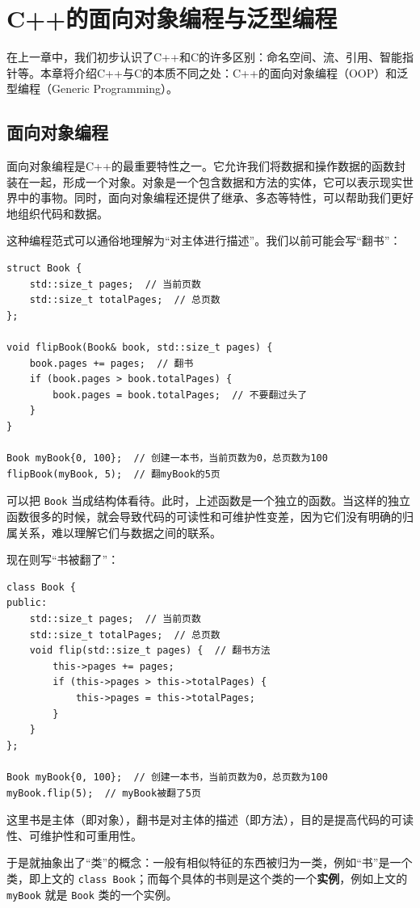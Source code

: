 \chapter{C++的面向对象编程与泛型编程}

在上一章中，我们初步认识了C++和C的许多区别：命名空间、流、引用、智能指针等。本章将介绍C++与C的本质不同之处：C++的面向对象编程（OOP）和泛型编程（Generic Programming）。

\section{面向对象编程}\label{sec:oop}

面向对象编程是C++的最重要特性之一。它允许我们将数据和操作数据的函数封装在一起，形成一个对象。对象是一个包含数据和方法的实体，它可以表示现实世界中的事物。同时，面向对象编程还提供了继承、多态等特性，可以帮助我们更好地组织代码和数据。

这种编程范式可以通俗地理解为“对主体进行描述”。我们以前可能会写“翻书”：
\begin{verbatim}
struct Book {
    std::size_t pages;  // 当前页数
    std::size_t totalPages;  // 总页数
};

void flipBook(Book& book, std::size_t pages) {
    book.pages += pages;  // 翻书
    if (book.pages > book.totalPages) {
        book.pages = book.totalPages;  // 不要翻过头了
    }
}

Book myBook{0, 100};  // 创建一本书，当前页数为0，总页数为100
flipBook(myBook, 5);  // 翻myBook的5页
\end{verbatim}
可以把 \verb|Book| 当成结构体看待。此时，上述函数是一个独立的函数。当这样的独立函数很多的时候，就会导致代码的可读性和可维护性变差，因为它们没有明确的归属关系，难以理解它们与数据之间的联系。

现在则写“书被翻了”：
\begin{verbatim}
class Book {
public:
    std::size_t pages;  // 当前页数
    std::size_t totalPages;  // 总页数
    void flip(std::size_t pages) {  // 翻书方法
        this->pages += pages; 
        if (this->pages > this->totalPages) {
            this->pages = this->totalPages; 
        }
    }
};

Book myBook{0, 100};  // 创建一本书，当前页数为0，总页数为100
myBook.flip(5);  // myBook被翻了5页
\end{verbatim}

这里书是主体（即对象），翻书是对主体的描述（即方法），目的是提高代码的可读性、可维护性和可重用性。

于是就抽象出了“类”的概念：一般有相似特征的东西被归为一类，例如“书”是一个类，即上文的 \verb|class Book|；而每个具体的书则是这个类的一个\textbf{实例}，例如上文的 \verb|myBook| 就是 \verb|Book| 类的一个实例。

